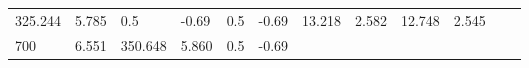 \documentclass{article}
\begin{document}
\begin{longtable}[]{@{}llllllllllll@{}}
\begin{minipage}[t]{0.06\columnwidth}
325.244\strut
\end{minipage} & \begin{minipage}[t]{0.08\columnwidth}\raggedright\strut
5.785\strut
\end{minipage} & \begin{minipage}[t]{0.03\columnwidth}\raggedright\strut
0.5\strut
\end{minipage} & \begin{minipage}[t]{0.06\columnwidth}\raggedright\strut
-0.69\strut
\end{minipage} & \begin{minipage}[t]{0.03\columnwidth}\raggedright\strut
0.5\strut
\end{minipage} & \begin{minipage}[t]{0.06\columnwidth}\raggedright\strut
-0.69\strut
\end{minipage} & \begin{minipage}[t]{0.06\columnwidth}\raggedright\strut
13.218\strut
\end{minipage} & \begin{minipage}[t]{0.08\columnwidth}\raggedright\strut
2.582\strut
\end{minipage} & \begin{minipage}[t]{0.06\columnwidth}\raggedright\strut
12.748\strut
\end{minipage} & \begin{minipage}[t]{0.09\columnwidth}\raggedright\strut
2.545\strut
\end{minipage}\tabularnewline
\begin{minipage}[t]{0.03\columnwidth}\raggedright\strut
700\strut
\end{minipage} & \begin{minipage}[t]{0.06\columnwidth}\raggedright\strut
6.551\strut
\end{minipage} & \begin{minipage}[t]{0.06\columnwidth}\raggedright\strut
350.648\strut
\end{minipage} & \begin{minipage}[t]{0.08\columnwidth}\raggedright\strut
5.860\strut
\end{minipage} & \begin{minipage}[t]{0.03\columnwidth}\raggedright\strut
0.5\strut
\end{minipage} & \begin{minipage}[t]{0.06\columnwidth}\raggedright\strut
-0.69\strut
\end{minipage} & \begin{minipage}[t]{0.03\columnwidth}\raggedright\strut

\end{minipage}
\end{longtable}
\end{document}
